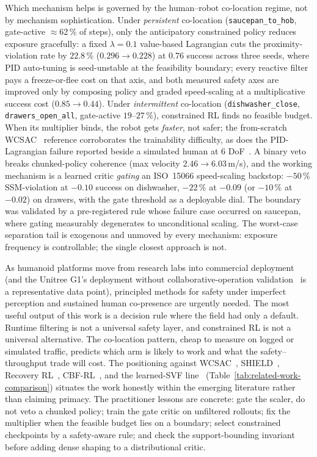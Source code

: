 \documentclass[11pt,a4paper]{report}
\newcommand{\ssm}{SSM}
\newcommand{\iso}{ISO~15066}
\begin{document}
\noindent
Which mechanism helps is governed by the human--robot co-location
regime, not by mechanism sophistication. Under \emph{persistent}
co-location (\texttt{saucepan\_to\_hob}, gate-active
$\approx$62\,\% of steps), only the anticipatory constrained policy
reduces exposure gracefully: a fixed $\lambda = 0.1$ value-based
Lagrangian cuts the proximity-violation rate by $22.8\,\%$
($0.296 \to 0.228$) at $0.76$ success across three seeds, where PID
auto-tuning is seed-unstable at the feasibility boundary; every
reactive filter pays a freeze-or-flee cost on that axis, and both
measured safety axes are improved only by composing policy and graded
speed-scaling at a multiplicative success cost ($0.85 \to 0.44$).
Under
\emph{intermittent} co-location (\texttt{dishwasher\_close},
\texttt{drawers\_open\_all}, gate-active $19$--$27\,\%$),
constrained RL finds no feasible budget. When its multiplier binds,
the robot gets \emph{faster}, not safer; the from-scratch
WCSAC~\cite{yang2021wcsac} reference corroborates the trainability
difficulty, as does the PID-Lagrangian failure reported beside a
simulated human at 6 DoF~\cite{thumm2023interventions}. A binary veto breaks chunked-policy coherence (max velocity
$2.46 \to 6.03$\,m/s), and the working mechanism is a learned critic
\emph{gating} an \iso{} speed-scaling backstop: $-50\,\%$
\ssm{}-violation at $-0.10$ success on dishwasher, $-22\,\%$ at
$-0.09$ (or $-10\,\%$ at $-0.02$) on drawers, with the gate threshold
as a deployable dial.
The boundary was validated by a pre-registered rule whose failure case
occurred on saucepan, where gating measurably degenerates to
unconditional scaling. The worst-case separation tail is
exogenous and unmoved by every mechanism: exposure frequency is
controllable; the single closest approach is not.

\noindent
As humanoid platforms move from research labs into commercial
deployment (and the Unitree G1's deployment without
collaborative-operation validation~\cite{unitree_g1,hartmann2026iso}
is a representative data point),
principled methods for safety under imperfect perception and
sustained human co-presence are urgently needed. The most useful
output of this work is a decision rule where the field had only a
default. Runtime filtering is not a universal safety layer, and
constrained RL is not a universal alternative. The co-location
pattern, cheap to measure on logged or simulated traffic, predicts
which arm is likely to work and what the safety--throughput trade will
cost. The
positioning against WCSAC~\cite{yang2021wcsac},
SHIELD~\cite{shield2025}, Recovery
RL~\cite{thananjeyan2021recovery}, CBF-RL~\cite{cbfrl2024}, and the
learned-SVF line~\cite{srinivasan2020learning}
(Table~\ref{tab:related-work-comparison}) situates the work honestly
within the emerging literature rather than claiming primacy. The
practitioner lessons are concrete: gate the scaler, do not veto a
chunked policy; train the gate critic on unfiltered rollouts; fix the
multiplier when the feasible budget lies on a boundary; select
constrained checkpoints by a safety-aware rule; and check the
support-bounding invariant before adding dense shaping to a
distributional critic.
\end{document}
